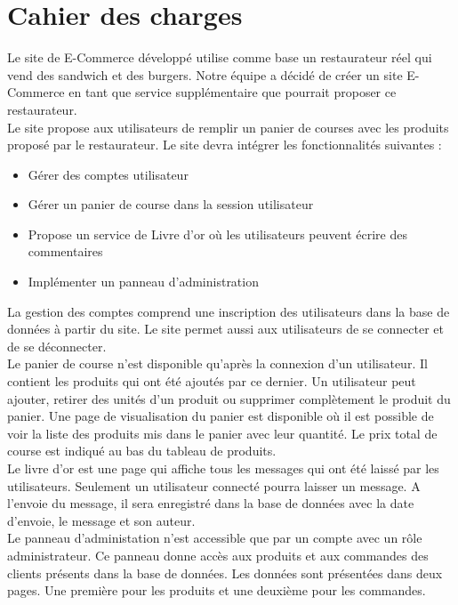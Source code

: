 \section{Cahier des charges}

Le site de E-Commerce développé utilise comme base un restaurateur réel qui
vend des sandwich et des burgers. Notre équipe a décidé de créer un site
E-Commerce en tant que service supplémentaire que pourrait proposer ce
restaurateur. \\

Le site propose aux utilisateurs de remplir un panier de courses avec les
produits proposé par le restaurateur. Le site devra intégrer les
fonctionnalités suivantes :

\begin{itemize}
	\item Gérer des comptes utilisateur
	\item Gérer un panier de course dans la session utilisateur
	\item Propose un service de Livre d'or où les utilisateurs peuvent écrire
		des commentaires
	\item Implémenter un panneau d'administration
\end{itemize}

La gestion des comptes comprend une inscription des utilisateurs dans la base
de données à partir du site. Le site permet aussi aux utilisateurs de se
connecter et de se déconnecter. \\

Le panier de course n'est disponible qu'après la connexion d'un utilisateur. Il
contient les produits qui ont été ajoutés par ce dernier. Un utilisateur peut
ajouter, retirer des unités d'un produit ou supprimer complètement le produit
du panier. Une page de visualisation du panier est disponible où il est
possible de voir la liste des produits mis dans le panier avec leur quantité.
Le prix total de course est indiqué au bas du tableau de produits. \\

Le livre d'or est une page qui affiche tous les messages qui ont été laissé par
les utilisateurs. Seulement un utilisateur connecté pourra laisser un message.
A l'envoie du message, il sera enregistré dans la base de données avec la date
d'envoie, le message et son auteur. \\

Le panneau d'administation n'est accessible que par un compte avec un rôle
administrateur. Ce panneau donne accès aux produits et aux commandes des
clients présents dans la base de données. Les données sont présentées dans deux
pages. Une première pour les produits et une deuxième pour les commandes. \\

